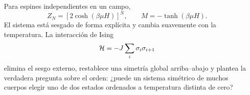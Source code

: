 Para espines independientes en un campo,
\begin{equation}
 Z_N=\left[2\cosh(\beta\mu H)\right]^N,
 \qquad
 M=-\tanh(\beta\mu H).
 \label{eq:sm8-summary-spins}
\end{equation}
El sistema está sesgado de forma explícita y cambia suavemente con la temperatura. La interacción de Ising
\begin{equation}
 {\cal H}=-J\sum_i\sigma_i\sigma_{i+1}
 \label{eq:sm8-summary-ising}
\end{equation}
elimina el sesgo externo, restablece una simetría global arriba--abajo y plantea la verdadera pregunta sobre el orden: ¿puede un sistema simétrico de muchos cuerpos elegir uno de dos estados ordenados a temperatura distinta de cero?
